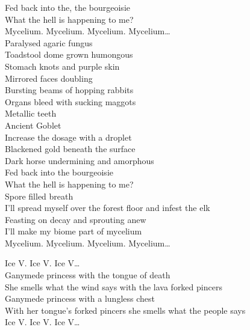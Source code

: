 Fed back into the, the bourgeoisie\\
What the hell is happening to me?\\

Mycelium. Mycelium. Mycelium. Mycelium…\\

Paralysed agaric fungus\\
Toadstool dome grown humongous\\
Stomach knots and purple skin\\
Mirrored faces doubling\\
Bursting beams of hopping rabbits\\
Organs bleed with sucking maggots\\
Metallic teeth\\
Ancient Goblet\\
Increase the dosage with a droplet\\
Blackened gold beneath the surface\\
Dark horse undermining and amorphous\\
Fed back into the bourgeoisie\\
What the hell is happening to me?\\
Spore filled breath\\
I'll spread myself over the forest floor and infest the elk\\
Feasting on decay and sprouting anew\\
I'll make my biome part of mycelium\\

Mycelium. Mycelium. Mycelium. Mycelium…\\




Ice V. Ice V. Ice V…\\

Ganymede princess with the tongue of death\\
She smells what the wind says with the lava forked pincers\\
Ganymede princess with a lungless chest\\
With her tongue's forked pincers she smells what the people says\\

Ice V. Ice V. Ice V…\\

